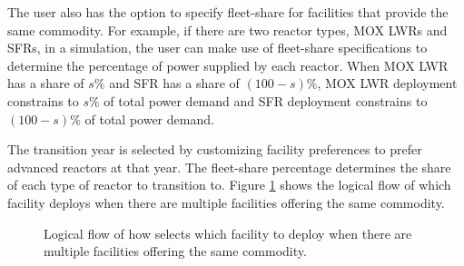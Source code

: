     The user also has the option to specify fleet-share for facilities 
    that provide the same commodity. 
    For example, if there are two reactor types, \gls{MOX} LWRs and SFRs, in a simulation,
    the user can make use of fleet-share specifications to determine the 
    percentage of power supplied by each reactor.   
    When MOX LWR has a share of $s\%$ and 
    \gls{SFR} has a share of $(100-s)\%$, 
    MOX LWR deployment constrains to $s\%$ of total power demand 
    and SFR deployment constrains to $(100-s)\%$ of total power demand. 

    The transition year is selected by customizing facility 
    preferences to prefer advanced reactors at that year.
    The fleet-share percentage determines the
    share of each type of reactor to transition to. 
    Figure \ref{fig:deployflow} shows the logical flow of
    which facility \deploy deploys when there are multiple facilities 
    offering the same commodity. 

\begin{figure}[]
	\centering
	
    \caption{Logical flow of how \deploy 
	selects which facility to deploy when there are multiple facilities 
	offering the same commodity.}
	\label{fig:deployflow}
\end{figure}

